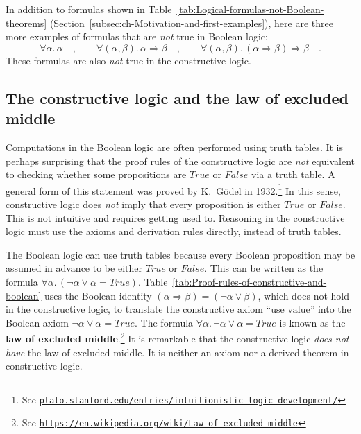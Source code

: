 In addition to formulas shown in Table~\ref{tab:Logical-formulas-not-Boolean-theorems}
(Section~\ref{subsec:ch-Motivation-and-first-examples}), here are
three more examples of formulas that are \emph{not} true in Boolean
logic:
\[
\forall\alpha.\,\alpha\quad,\quad\quad\forall(\alpha,\beta).\,\alpha\Rightarrow\beta\quad,\quad\quad\forall(\alpha,\beta).\,(\alpha\Rightarrow\beta)\Rightarrow\beta\quad.
\]
These formulas are also \emph{not} true in the constructive logic.

\subsection{The constructive logic and the law of excluded middle}

Computations in the Boolean logic are often performed using truth
tables. It is perhaps surprising that the proof rules of the constructive
logic are \emph{not} equivalent to checking whether some propositions
are $True$ or $False$ via a truth table. A general form of this
statement was proved by K.~G\"odel in
1932.\footnote{See \texttt{\href{https://plato.stanford.edu/entries/intuitionistic-logic-development/\#SomeEarlResu}{plato.stanford.edu/entries/intuitionistic-logic-development/}}}
In this sense, constructive logic does \emph{not} imply that every
proposition is either $True$ or $False$. This is not intuitive and
requires getting used to. Reasoning in the constructive logic must
use the axioms and derivation rules directly, instead of truth tables.

The Boolean logic can use truth tables because every Boolean proposition
may be assumed in advance to be either $True$ or $False$. This can
be written as the formula $\forall\alpha.\,(\neg\alpha\vee\alpha=True)$.
Table~\ref{tab:Proof-rules-of-constructive-and-boolean} uses the
Boolean identity $\left(\alpha\Rightarrow\beta\right)=(\neg\alpha\vee\beta)$,
which does not hold in the constructive logic, to translate the constructive
axiom \textsf{``}$\text{use value}$\textsf{''} into the Boolean axiom $\neg\alpha\vee\alpha=True$.
The formula $\forall\alpha.\,\neg\alpha\vee\alpha=True$ is known
as the \textbf{law of excluded middle}.\footnote{See \texttt{\href{https://en.wikipedia.org/wiki/Law_of_excluded_middle}{https://en.wikipedia.org/wiki/Law\_of\_excluded\_middle}}}
It is remarkable that the constructive logic \emph{does not have}
the law of excluded middle. It is neither an axiom nor a derived theorem
in constructive logic.

